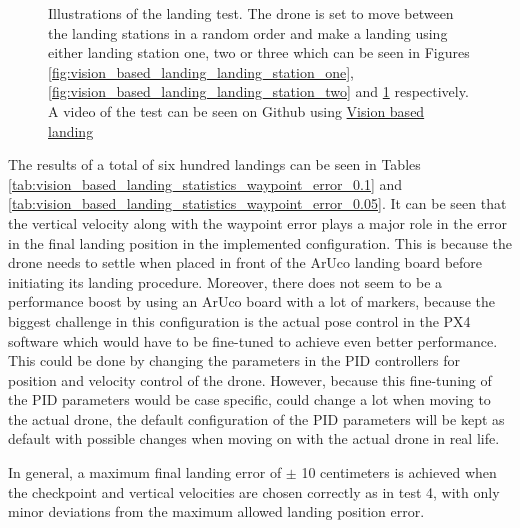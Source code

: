 \documentclass[../Head/report.tex]{subfiles}
\begin{document}
\begin{figure}[H]
\begin{subfigure}[t]{.30\textwidth}
        \caption{}
        \label{fig:vision_based_landing_landing_station_three}
    \end{subfigure}
    \caption{Illustrations of the landing test. The drone is set to move between the landing stations in a random order and make a landing using either landing station one, two or three which can be seen in Figures \ref{fig:vision_based_landing_landing_station_one}, \ref{fig:vision_based_landing_landing_station_two} and \ref{fig:vision_based_landing_landing_station_three} respectively. A video of the test can be seen on Github using \href{https://github.com/Kenil16/master_project/tree/master/test_videos/vision_landing_precision_and_accuracy_vertical_vel_0.5_max_error_0.05}{Vision based landing}}
    \label{fig:vision_based_landing_landing_stations}
\end{figure}

The results of a total of six hundred landings can be seen in Tables \ref{tab:vision_based_landing_statistics_waypoint_error_0.1} and \ref{tab:vision_based_landing_statistics_waypoint_error_0.05}. It can be seen that the vertical velocity along with the waypoint error plays a major role in the error in the final landing position in the implemented configuration. This is because the drone needs to settle when placed in front of the ArUco landing board before initiating its landing procedure. Moreover, there does not seem to be a performance boost by using an ArUco board with a lot of markers, because the biggest challenge in this configuration is the actual pose control in the PX4 software which would have to be fine-tuned to achieve even better performance. This could be done by changing the parameters in the PID controllers for position and velocity control of the drone. However, because this fine-tuning of the PID parameters would be case specific, could change a lot when moving to the actual drone, the default configuration of the PID parameters will be kept as default with possible changes when moving on with the actual drone in real life. 

In general, a maximum final landing error of $\pm$ 10 centimeters is achieved when the checkpoint and vertical velocities are chosen correctly as in test 4, with only minor deviations from the maximum allowed landing position error.   
\end{document}

